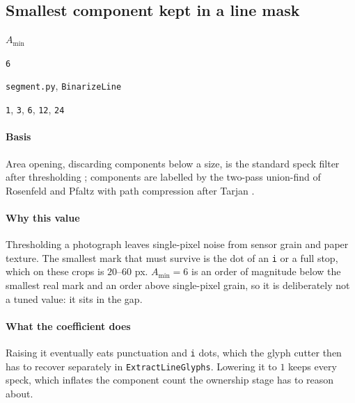 \subsection{Smallest component kept in a line mask}

\label{coef:speck-area}

\begin{description}[leftmargin=5.2em,style=sameline]

\item[Symbol] $A_{\min}$

\item[Value] \texttt{6}

\item[Source] \texttt{segment.py}, \texttt{BinarizeLine}

\item[Swept] \texttt{1}, \texttt{3}, \texttt{6}, \texttt{12}, \texttt{24}

\end{description}

\paragraph{Basis}

Area opening, discarding components below a size, is the standard speck filter after thresholding \cite{haralick1987}; components are labelled by the two-pass union-find of Rosenfeld and Pfaltz \cite{rosenfeld1966} with path compression after Tarjan \cite{tarjan1975}.

\paragraph{Why this value}

Thresholding a photograph leaves single-pixel noise from sensor grain and paper texture. The smallest mark that must survive is the dot of an \texttt{i} or a full stop, which on these crops is $20$--$60$ px. $A_{\min}=6$ is an order of magnitude below the smallest real mark and an order above single-pixel grain, so it is deliberately not a tuned value: it sits in the gap.

\paragraph{What the coefficient does}

Raising it eventually eats punctuation and \texttt{i} dots, which the glyph cutter then has to recover separately in \texttt{ExtractLineGlyphs}. Lowering it to $1$ keeps every speck, which inflates the component count the ownership stage has to reason about.

